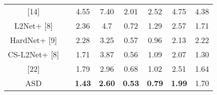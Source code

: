 \documentclass[letterpaper, 10 pt, conference]{ieeeconf}  %
\begin{document}
\begin{table}[h]
\begin{center}
\begin{tabular}{cccccccc}
  \cline{3-8}
\multirow{1}{*}{[14]}   & \multicolumn{1}{c}{}  & \multicolumn{1}{c}{4.55} & \multicolumn{1}{c}{7.40} & \multicolumn{1}{c}{2.01}  & \multicolumn{1}{c}{2.52}  & \multicolumn{1}{c}{4.75}  & \multicolumn{1}{c}{4.38}  \\
  \cline{3-8}
\multirow{1}{*}{L2Net+ [8]}   & \multicolumn{1}{c}{}  & \multicolumn{1}{c}{2.36} & \multicolumn{1}{c}{4.7} & \multicolumn{1}{c}{0.72}  & \multicolumn{1}{c}{1.29}  & \multicolumn{1}{c}{2.57}  & \multicolumn{1}{c}{1.71}  \\
  \cline{3-8}
\multirow{1}{*}{HardNet+ [9]}   & \multicolumn{1}{c}{}  & \multicolumn{1}{c}{2.28} & \multicolumn{1}{c}{3.25} & \multicolumn{1}{c}{0.57}  & \multicolumn{1}{c}{0.96}  & \multicolumn{1}{c}{2.13}  & \multicolumn{1}{c}{2.22}  \\
  \cline{3-8}
\multirow{1}{*}{CS-L2Net+ [8]}   & \multicolumn{1}{c}{}  & \multicolumn{1}{c}{1.71} & \multicolumn{1}{c}{3.87} & \multicolumn{1}{c}{0.56}  & \multicolumn{1}{c}{1.09}  & \multicolumn{1}{c}{2.07}  & \multicolumn{1}{c}{1.30}  \\
  \cline{3-8}
\multirow{1}{*}{[22]}  & \multicolumn{1}{c}{}  & \multicolumn{1}{c}{1.79} & \multicolumn{1}{c}{2.96} & \multicolumn{1}{c}{0.68}  & \multicolumn{1}{c}{1.02}  & \multicolumn{1}{c}{2.51}  & \multicolumn{1}{c}{1.64}  \\
  \cline{3-8}
\multirow{1}{*}{ASD}  & \multicolumn{1}{c}{}  & \multicolumn{1}{c}{\textbf{1.43}} & \multicolumn{1}{c}{\textbf{2.60}} & \multicolumn{1}{c}{\textbf{0.53}}  & \multicolumn{1}{c}{\textbf{0.79}}  & \multicolumn{1}{c}{\textbf{1.99}}  & \multicolumn{1}{c}{1.70}  \\
\bottomrule
\toprule
\end{tabular} 
\end{center}
\end{table}
\end{document}
